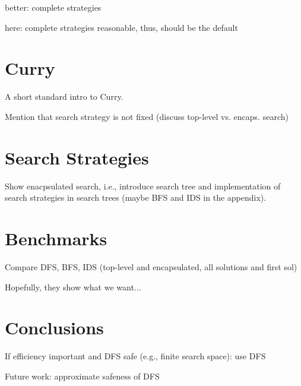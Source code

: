 \documentclass[english]{lni}
\begin{document}
better: complete strategies

here: complete strategies reasonable, thus, should be the default

\section{Curry}

A short standard intro to Curry.

Mention that search strategy is not fixed
 (discuss top-level vs. encaps. search)

\section{Search Strategies}

Show enacpsulated search, i.e., introduce search tree
and implementation of search strategies in search trees
(maybe BFS and IDS in the appendix).

\section{Benchmarks}

Compare DFS, BFS, IDS (top-level and encapsulated, all solutions and first sol)

Hopefully, they show what we want...

\section{Conclusions}

If efficiency important and DFS safe (e.g., finite search space): use DFS

Future work: approximate safeness of DFS



%
\end{document}
